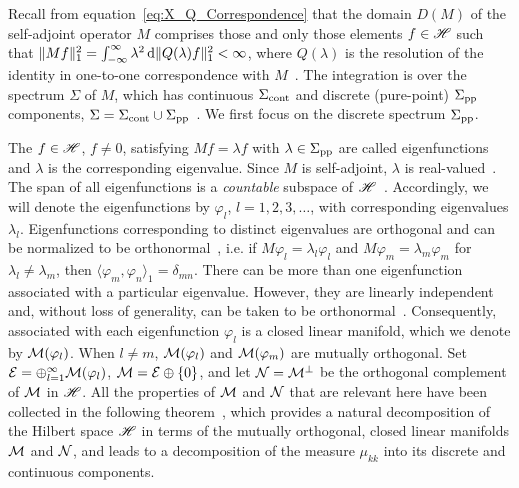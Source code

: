 \documentclass[amsa]{ipart}
\begin{document}
Recall from equation~\eqref{eq:X_Q_Correspondence} that the domain
$D(M)$ of the self-adjoint operator $M$ comprises those and only those
elements $f\in\mathscr{H}$ such that $\|Mf\|_1^2=\int_{-\infty}^\infty\lambda^2\,\mathrm{d}\|Q(\lambda)f\|_1^2<\infty$,
where $Q(\lambda)$ is the resolution of the identity in one-to-one
correspondence with $M$~\cite{Stone:64}. The integration is over the
spectrum $\Sigma$ of $M$, which has continuous $\Sigma_{\text{cont}}$ and discrete
(pure-point) $\Sigma_{\text{pp}}$ components,
$\Sigma=\Sigma_{\text{cont}}\cup\Sigma_{\text{pp}}$~\cite{Reed-1980,Stone:64}. We first focus on
the discrete spectrum $\Sigma_{\text{pp}}$.



 The $f\in\mathscr{H}$, $f\neq0$, satisfying $Mf=\lambda
f$ with $\lambda\in\Sigma_{\text{pp}}$ are called eigenfunctions and $\lambda$ is the
corresponding eigenvalue. Since $M$ is self-adjoint, $\lambda$ is
real-valued~\cite{Stone:64}. The
span of all eigenfunctions is a \emph{countable} subspace of
$\mathscr{H}$~\cite{Stone:64}. Accordingly, we will denote the
eigenfunctions by $\varphi_l$, $l=1,2,3,\ldots$, with corresponding eigenvalues
$\lambda_l$. Eigenfunctions corresponding to distinct eigenvalues
are orthogonal and can be normalized to be
orthonormal~\cite{Stone:64}, i.e. if $M\varphi_l=\lambda_l\varphi_l$ and $M\varphi_m=\lambda_m\varphi_m$
for $\lambda_l\neq\lambda_m$, then $\langle\varphi_m,\varphi_n\rangle_1=\delta_{mn}$.
There can be more than one eigenfunction associated with a particular
eigenvalue. However, they are linearly independent
and, without loss of generality, can be taken to be
orthonormal~\cite{Stone:64}. Consequently, associated with each
eigenfunction $\varphi_l$ is a closed linear manifold, which we denote by
$\mathcal{M}(\varphi_l)$. When $l\neq m$, $\mathcal{M}(\varphi_l)$ and $\mathcal{M}(\varphi_m)$ are mutually 
orthogonal. Set $\mathcal{E}=\oplus_{l=1}^\infty\mathcal{M}(\varphi_l)$, $\mathcal{M}=\mathcal{E}\oplus\{0\}$, and let
$\mathcal{N}=\mathcal{M}^\perp$ be the orthogonal complement of $\mathcal{M}$ in $\mathscr{H}$. All the
properties of $\mathcal{M}$ and $\mathcal{N}$ that are relevant here have been
collected in the following theorem~\cite{Stone:64}, which provides a
natural decomposition of the Hilbert space $\mathscr{H}$ in terms of the
mutually orthogonal, closed linear manifolds $\mathcal{M}$ and $\mathcal{N}$, and
leads to a decomposition of the measure $\mu_{kk}$ into its discrete and
continuous components. 
%
\end{document}

